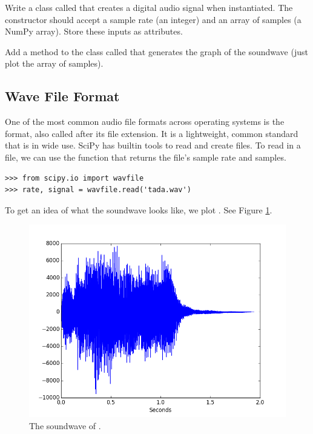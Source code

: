 \begin{problem}
Write a class called  that creates a digital audio signal when instantiated.
The constructor should accept a sample rate (an integer) and an array of samples (a NumPy array).
Store these inputs as attributes.

Add a method to the class called  that generates the graph of the soundwave (just plot the array of samples). %

\end{problem}

\subsection*{Wave File Format} 

One of the most common audio file formats across operating systems is the  format, also called  after its file extension.
It is a lightweight, common standard that is in wide use.
SciPy has builtin tools to read and create  files.
To read in a  file, we can use the  function that returns the file's sample rate and samples.

\begin{lstlisting}
>>> from scipy.io import wavfile
>>> rate, signal = wavfile.read('tada.wav')
\end{lstlisting}

To get an idea of what the soundwave looks like, we plot .
See Figure \ref{fig:tada_sig}.

\begin{figure}[ht]\centering\includegraphics[width=\textwidth]{tada.png}\caption{The soundwave of .}\label{fig:tada_sig}\end{figure}

